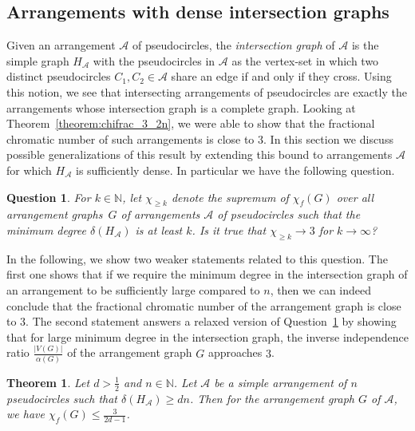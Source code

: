 \documentclass[fontsize=11pt,a4paper,DIV12]{scrartcl}
\newtheorem{theorem}{Theorem}
\newtheorem{question}{Question}
\begin{document}
\subsection{Arrangements with dense intersection graphs}
Given an arrangement $\mathcal{A}$ of pseudocircles, the
\emph{intersection graph} of $\mathcal{A}$ is the simple graph
$H_{\mathcal{A}}$ with the pseudocircles in $\mathcal{A}$ as the vertex-set in
which two distinct pseudocircles $C_1, C_2 \in \mathcal{A}$ share an edge if
and only if they cross. Using this notion, we see that intersecting
arrangements of pseudocircles are exactly the arrangements whose
intersection graph is a complete graph. Looking at
Theorem~\ref{theorem:chifrac_3_2n}, we were able to show that the fractional
chromatic number of such arrangements is close to $3$. In this section we
discuss possible generalizations of this result by extending this bound to
arrangements $\mathcal{A}$ for which $H_{\mathcal{A}}$ is sufficiently
dense. In particular we have the following question.
\begin{question}\label{question:largemindegree}
  For $k \in \mathbb{N}$, let $\chi_{\ge k}$ denote the supremum of
  $\chi_f(G)$ over all arrangement graphs~$G$ of arrangements $\mathcal{A}$ of
  pseudocircles such that the minimum degree $\delta(H_{\mathcal{A}})$ is at least
  $k$. Is it true that $\chi_{\ge k} \rightarrow 3$ for
  $k \rightarrow \infty$?
\end{question}
In the following, we show two weaker statements related to this question. The
first one shows that if we require the minimum degree in the intersection
graph of an arrangement to be sufficiently large compared to $n$, then we can
indeed conclude that the fractional chromatic number of the arrangement graph
is close to $3$. The second statement answers a relaxed version of
Question~\ref{question:largemindegree} by showing that for large minimum
degree in the intersection graph, the inverse independence ratio
$\frac{|V(G)|}{\alpha(G)}$ of the arrangement graph $G$ approaches $3$.
\begin{theorem}\label{theorem:largedegree}
  Let $d>\frac{1}{2}$ and $n \in \mathbb{N}$. Let $\mathcal{A}$ be a simple
  arrangement of $n$ pseudocircles such that $\delta(H_{\mathcal{A}}) \ge
  dn$. Then for the arrangement graph $G$ of $\mathcal{A}$, we have
  $\chi_f(G) \le \frac{3}{2d-1}$.
\end{theorem}
\end{document}
